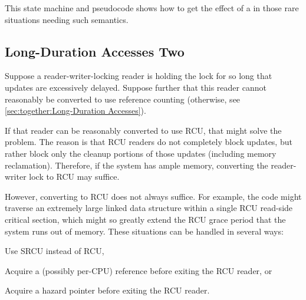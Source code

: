 This state machine and pseudocode shows how to get the effect of a
 in those rare situations needing such semantics.

\subsection{Long-Duration Accesses Two}
\label{sec:together:Long-Duration Accesses Two}

Suppose a reader-writer-locking reader is holding the lock for so
long that updates are excessively delayed.
Suppose further that this reader cannot reasonably be converted to
use reference counting
(otherwise, see \cref{sec:together:Long-Duration Accesses}).

If that reader can be reasonably converted to use RCU, that might
solve the problem.
The reason is that RCU readers do not completely block updates, but
rather block only the cleanup portions of those updates (including
memory reclamation).
Therefore, if the system has ample memory, converting the reader-writer
lock to RCU may suffice.

However, converting to RCU does not always suffice.
For example, the code might traverse an extremely large linked data
structure within a single RCU read-side critical section, which might
so greatly extend the RCU grace period that the system runs out of memory.
These situations can be handled in several ways:
\begin{enumerate*}[(1)]
\item	Use SRCU instead of RCU,
\item	Acquire a (possibly per-CPU) reference before exiting the RCU
	reader, or
\item	Acquire a hazard pointer before exiting the RCU reader.
\end{enumerate*}

\QuickQuizEnd

